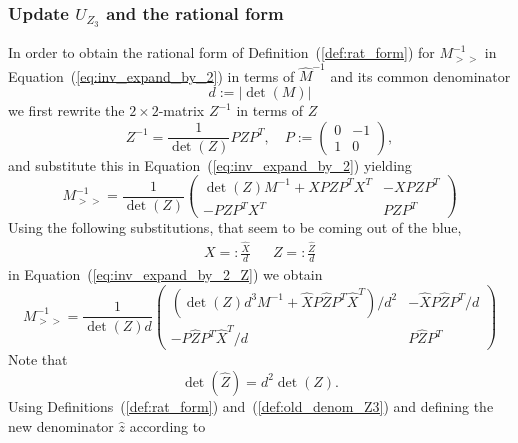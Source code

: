 \documentclass[a4paper]{article}
\begin{document}
\subsubsection{Update $U_{Z_{3}}$ and the rational form}
In order to obtain the rational form of Definition~(\ref{def:rat_form})
for $M_{>>}^{-1}$ in
Equation~(\ref{eq:inv_expand_by_2}) in terms of $\hat{M}^{-1}$
and its common denominator
\begin{equation}
\label{def:old_denom_Z3}
d:=\left|\det\left(M\right)\right|
\end{equation}
we first rewrite the $2 \times 2$-matrix $Z^{-1}$ in terms of $Z$
\begin{equation}
\label{eq:2_by_2_matrix_inverse}
Z^{-1}=\frac{1}{\det\left(Z\right)}PZP^{T}, \quad
P:=
\left(
\begin{array}{cr}
0 & -1 \\
1 & 0
\end{array}
\right),
\end{equation}
and substitute this in Equation~(\ref{eq:inv_expand_by_2}) yielding
\begin{equation}
\label{eq:inv_expand_by_2_Z}
M_{>>}^{-1}=
\frac{1}{\det\left(Z\right)}
\left(
\begin{array}{c|c}
\det\left(Z\right)M^{-1} + XPZP^{T}X^{T} & -XPZP^{T} \\
\hline
-PZP^{T}X^{T}     & PZP^{T}
\end{array}
\right)
\end{equation}
Using the following substitutions, that seem to be coming out of the blue, 
\begin{eqnarray}
\label{def:X_hat_Z_hat}
X=:\frac{\hat{X}}{d} & & Z=:\frac{\hat{Z}}{d}
\end{eqnarray}
in Equation~(\ref{eq:inv_expand_by_2_Z}) we obtain
\begin{equation}
\label{eq:inv_expand_2_Z3}
M_{>>}^{-1}=
\frac{1}{\det\left(Z\right)d}
\left(
\begin{array}{c|c}
(\det\left(Z\right)d^{3}M^{-1}+\hat{X}P\hat{Z}P^{T}\hat{X}^{T})/ d^{2} &
-\hat{X}P\hat{Z}P^{T}/d  \\
\hline
-P\hat{Z}P^{T}\hat{X}^{T}/d & P\hat{Z}P^{T} 
\end{array}
\right)
\end{equation}
Note that 
\begin{equation}
\label{eq:det_hat_Z}
\det(\hat{Z})=d^{2}\det\left(Z\right).
\end{equation}
Using Definitions~(\ref{def:rat_form}) and~(\ref{def:old_denom_Z3})
and defining the new denominator $\hat{z}$ according to 
\end{document}
